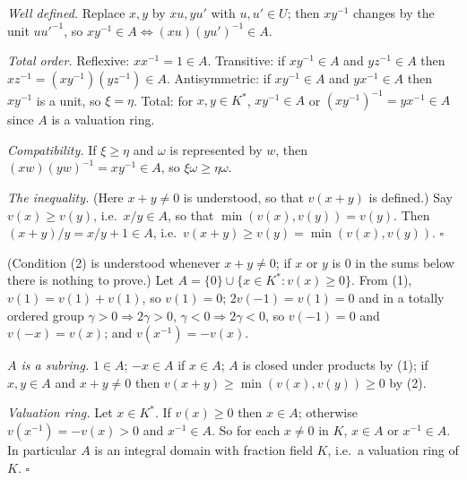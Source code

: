 \documentclass[11pt]{article}
\begin{document}
\emph{Well defined.} Replace $x,y$ by $xu,yu'$ with $u,u'\in U$; then $xy^{-1}$ changes by the unit $uu'^{-1}$, so $xy^{-1}\in A\iff(xu)(yu')^{-1}\in A$.

\emph{Total order.} Reflexive: $xx^{-1}=1\in A$. Transitive: if $xy^{-1}\in A$ and $yz^{-1}\in A$ then $xz^{-1}=(xy^{-1})(yz^{-1})\in A$. Antisymmetric: if $xy^{-1}\in A$ and $yx^{-1}\in A$ then $xy^{-1}$ is a unit, so $\xi=\eta$. Total: for $x,y\in K^*$, $xy^{-1}\in A$ or $(xy^{-1})^{-1}=yx^{-1}\in A$ since $A$ is a valuation ring.

\emph{Compatibility.} If $\xi\ge\eta$ and $\omega$ is represented by $w$, then $(xw)(yw)^{-1}=xy^{-1}\in A$, so $\xi\omega\ge\eta\omega$.

\emph{The inequality.} (Here $x+y\ne0$ is understood, so that $v(x+y)$ is defined.) Say $v(x)\ge v(y)$, i.e.\ $x/y\in A$, so that $\min(v(x),v(y))=v(y)$. Then $(x+y)/y=x/y+1\in A$, i.e.\ $v(x+y)\ge v(y)=\min(v(x),v(y))$. \hfill$\square$

\pf
(Condition (2) is understood whenever $x+y\ne0$; if $x$ or $y$ is $0$ in the sums below there is nothing to prove.) Let $A=\{0\}\cup\{x\in K^*:v(x)\ge0\}$. From (1), $v(1)=v(1)+v(1)$, so $v(1)=0$; $2v(-1)=v(1)=0$ and in a totally ordered group $\gamma>0\Rightarrow2\gamma>0$, $\gamma<0\Rightarrow2\gamma<0$, so $v(-1)=0$ and $v(-x)=v(x)$; and $v(x^{-1})=-v(x)$.

\emph{$A$ is a subring.} $1\in A$; $-x\in A$ if $x\in A$; $A$ is closed under products by (1); if $x,y\in A$ and $x+y\ne0$ then $v(x+y)\ge\min(v(x),v(y))\ge0$ by (2).

\emph{Valuation ring.} Let $x\in K^*$. If $v(x)\ge0$ then $x\in A$; otherwise $v(x^{-1})=-v(x)>0$ and $x^{-1}\in A$. So for each $x\ne0$ in $K$, $x\in A$ or $x^{-1}\in A$. In particular $A$ is an integral domain with fraction field $K$, i.e.\ a valuation ring of $K$. \hfill$\square$
\end{document}
